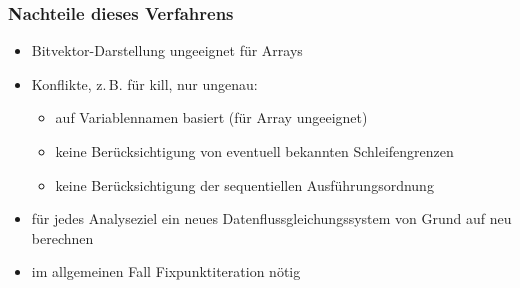 
\subsubsection{Nachteile dieses Verfahrens} %
\label{ssub:nachteile_dieses_verfahrens}
\begin{itemize}
    \item Bitvektor-Darstellung ungeeignet für Arrays
    \item Konflikte, z.\,B. für kill, nur ungenau:
    \begin{itemize}
        \item auf Variablennamen basiert (für Array ungeeignet)
        \item keine Berücksichtigung von eventuell bekannten Schleifengrenzen
        \item keine Berücksichtigung der sequentiellen Ausführungsordnung
    \end{itemize}
    \item für jedes Analyseziel ein neues Datenflussgleichungssystem von Grund auf neu berechnen
    \item im allgemeinen Fall Fixpunktiteration nötig
\end{itemize}
